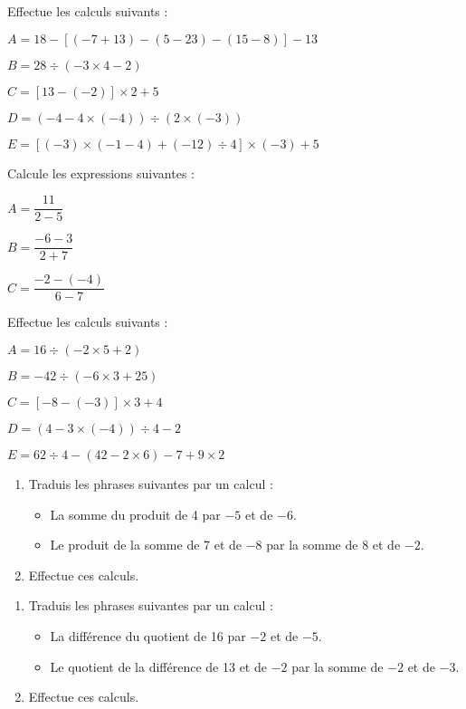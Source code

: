 \begin{exercice}Effectue les calculs suivants :

$A = 18 -[(-7 +13 ) -( 5 -23) -( 15 -8 )] -13$

$B = 28 \div (-3 \times 4 -2)$

$C = [13 -(-2)] \times 2 +5$

$D = (- 4 - 4 \times (- 4)) \div (2 \times (- 3))$

$E = [(-3) \times (-1 -4) +(-12) \div 4] \times (-3) +5$
\end{exercice}




\begin{exercice}Calcule les expressions suivantes :

$A = \dfrac{11}{2-5}$

$B = \dfrac{-6-3}{2+7}$

$C = \dfrac{-2-(-4)}{6-7}$
\end{exercice}



\begin{exercice}Effectue les calculs suivants :

$A = 16 \div (-2 \times 5 +2)$

$B = - 42 \div (-6 \times 3 +25)$

$C = [-8 -(-3)] \times 3 +4$

$D = (4 - 3 \times (- 4)) \div 4 -2$

$E = 62 \div 4 -(42 -2 \times 6) -7 +9 \times 2$
\end{exercice}




\begin{exercice}[Vocabulaire]
\begin{enumerate}
\item Traduis les phrases suivantes par un calcul :
    \begin{itemize}
    \item La somme du produit de 4 par $-5$ et de $-6$.
    \item Le produit de la somme de 7 et de $-8$ par la somme de 8 et de $-2$.
    \end{itemize}
\item Effectue ces calculs.
\end{enumerate}
\end{exercice}

\columnbreak
\begin{exercice}
\begin{enumerate}
\item Traduis les phrases suivantes par un calcul :
    \begin{itemize}
    \item La différence du quotient de 16 par $-2$ et de $-5$.
    \item Le quotient de la différence de 13 et de $-2$ par la somme de $-2$ et de $-3$.
    \end{itemize}
\item Effectue ces calculs.
\end{enumerate}
\end{exercice}



